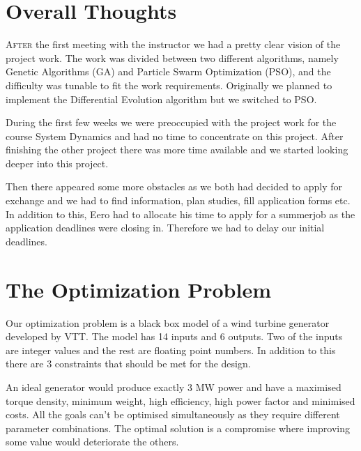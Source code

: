 \documentclass[twoside]{article}
\begin{document}
\begin{multicols}{2} %

\section{Overall Thoughts}

\lettrine[nindent=0em,lines=3]{A}{fter} the first meeting with the instructor we had a pretty clear vision of the project work. The work was divided between two different algorithms, namely Genetic Algorithms (GA) and Particle Swarm Optimization (PSO), and the difficulty was tunable to fit the work requirements. Originally we planned to implement the Differential Evolution algorithm but we switched to PSO.

During the first few weeks we were preoccupied with the project work for the course System Dynamics and had no time to concentrate on this project. After finishing the other project there was more time available and we started looking deeper into this project.

Then there appeared some more obstacles as we both had decided to apply for exchange and we had to find information, plan studies, fill application forms etc. In addition to this, Eero had to allocate his time to apply for a summerjob as the application deadlines were closing in. Therefore we had to delay our initial deadlines.


\section{The Optimization Problem}
Our optimization problem is a black box model of a wind turbine generator developed by VTT. The model has 14 inputs and 6 outputs. Two of the inputs are integer values and the rest are floating point numbers. In addition to this there are 3 constraints that should be met for the design. 

An ideal generator would produce exactly 3 MW power and have a maximised torque density, minimum weight, high efficiency, high power factor and minimised costs. All the goals can't be optimised simultaneously as they require different parameter combinations. The optimal solution is a compromise where improving some value would deteriorate the others.



\end{multicols}
\end{document}
